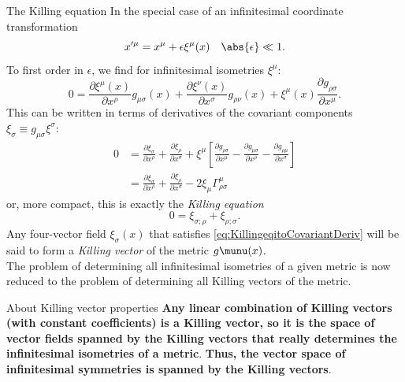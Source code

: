 \begin{mybox}{The Killing equation}
In the special case of an infinitesimal coordinate transformation 
\begin{equation}
	x^{\prime \mu} = x^\mu + \epsilon \xi^\mu(x) \quad \abs{\epsilon}\ll 1.
\end{equation}
To first order in $\epsilon$, we find for infinitesimal isometries $\xi^\mu$:
\begin{equation}
	0 = \frac{\partial \xi^\mu(x)}{\partial x^\rho} g_{\mu \sigma} (x) + \frac{\partial \xi^\nu(x)}{\partial x^\sigma} g_{\rho \nu}(x) + \xi^\mu(x) \frac{\partial g_{\rho \sigma}}{\partial x^\mu}.
\end{equation}
This can be written in terms of derivatives of the covariant components $\xi_\sigma\equiv g_{\mu \sigma} \xi^\sigma$:
\begin{align*}
	0&= \frac{\partial \xi_\sigma}{\partial x^\rho} + \frac{\partial \xi_\rho}{\partial x^\sigma} + \xi^\mu \left[\frac{\partial g_{\rho \sigma}}{\partial x^\mu} - \frac{\partial g_{\mu \sigma}}{\partial x^\rho} - \frac{\partial g_{\rho \mu}}{\partial x^\sigma}\right]\\
	&= \frac{\partial \xi_\sigma}{\partial x^\rho} +\frac{\partial \xi_\rho}{\partial x^\sigma} - 2\xi_\mu \Gamma^\mu_{\rho \sigma}
\end{align*}
or, more compact, this is exactly the \emph{Killing equation}
\begin{equation}
\label{eq:KillingeqitoCovariantDeriv}
	0 = \xi_{\sigma ; \rho} + \xi_{\rho ; \sigma}.
\end{equation}
Any four-vector field $\xi_\sigma(x)$ that satisfies \ref{eq:KillingeqitoCovariantDeriv} will be said to form a \emph{Killing vector} of the metric $g\munu(x)$.\\
The problem of determining all infinitesimal isometries of a given metric is now reduced to the problem of determining all Killing vectors of the metric. 

\end{mybox}
\begin{mybox}{About Killing vector properties}
	\textbf{Any linear combination of Killing vectors (with constant coefficients) is a Killing vector, so it is the space of vector fields spanned by the Killing vectors that really determines the infinitesimal isometries of a metric}. \textbf{Thus, the vector space of infinitesimal symmetries is spanned by the Killing vectors}.
\end{mybox}
